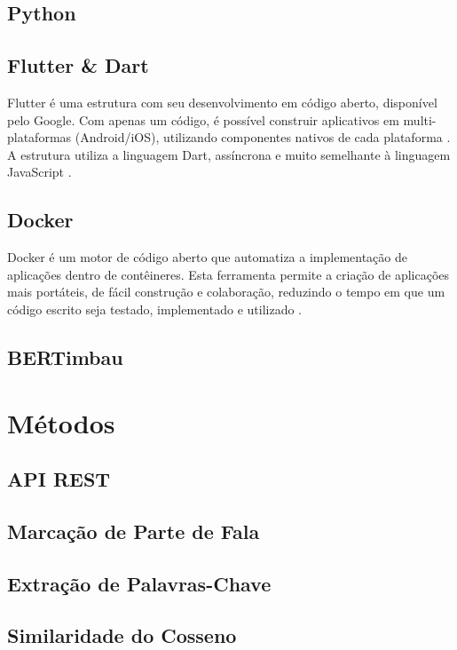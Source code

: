\subsection{Python}\label{subsec:python}


\subsection{Flutter {\&} Dart}\label{subsec:flutterdart}

Flutter é uma estrutura com seu desenvolvimento em código aberto, disponível pelo Google. Com apenas um código, é possível construir aplicativos em multi-plataformas (Android/iOS), utilizando componentes nativos de cada plataforma \cite{Flutter}. A estrutura utiliza a linguagem Dart, assíncrona e muito semelhante à linguagem JavaScript \cite{Dart}.

\subsection{Docker}\label{subsec:docker}

Docker é um motor de código aberto que automatiza a implementação de aplicações dentro de contêineres. Esta ferramenta permite a criação de aplicações mais portáteis, de fácil construção e colaboração, reduzindo o tempo em que um código escrito seja testado, implementado e utilizado \cite{TheDockerBook}.

\subsection{BERTimbau}\label{subsec:bertimbau}


\section{Métodos}\label{sec:metodo}

\subsection{API REST}\label{subsec:rest}


\subsection{Marcação de Parte de Fala}\label{subsec:pos_tagging}


\subsection{Extração de Palavras-Chave}\label{subsec:keyword_extraction}


\subsection{Similaridade do Cosseno}\label{subsec:cossine_similarity}

